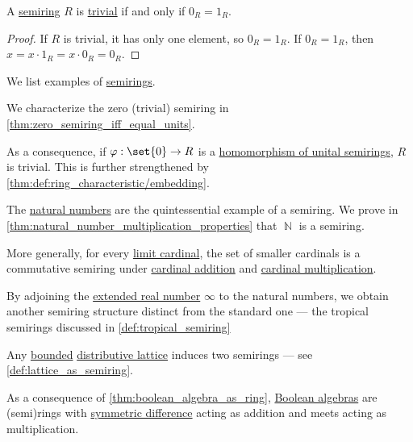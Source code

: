 \begin{proposition}\label{thm:zero_semiring_iff_equal_units}
  A \hyperref[def:semiring]{semiring} \( R \) is \hyperref[def:semiring/trivial]{trivial} if and only if \( 0_R = 1_R \).
\end{proposition}
\begin{proof}
  \SufficiencySubProof If \( R \) is trivial, it has only one element, so \( 0_R = 1_R \).
  \NecessitySubProof If \( 0_R = 1_R \), then \( x = x \cdot 1_R = x \cdot 0_R = 0_R \).
\end{proof}

\begin{example}\label{ex:def:semiring}
  We list examples of \hyperref[def:semiring]{semirings}.

  \begin{thmenum}
     We characterize the zero (trivial) semiring in \cref{thm:zero_semiring_iff_equal_units}.

    As a consequence, if \( \varphi: \set{ 0 } \to R \) is a \hyperref[def:semiring/morphism]{homomorphism of unital semirings}, \( R \) is trivial. This is further strengthened by \cref{thm:def:ring_characteristic/embedding}.

     The \hyperref[def:natural_numbers]{natural numbers} are the quintessential example of a semiring. We prove in \cref{thm:natural_number_multiplication_properties} that \( \BbbN \) is a semiring.

     More generally, for every \hyperref[def:successor_and_limit_cardinal]{limit cardinal}, the set of smaller cardinals is a commutative semiring under \hyperref[def:cardinal_addition]{cardinal addition} and \hyperref[def:cardinal_multiplication]{cardinal multiplication}.

     By adjoining the \hyperref[def:extended_real_numbers]{extended real number} \( \infty \) to the natural numbers, we obtain another semiring structure distinct from the standard one --- the tropical semirings discussed in \cref{def:tropical_semiring}

     Any \hyperref[def:bounded_lattice]{bounded} \hyperref[def:distributive_lattice]{distributive lattice} induces two semirings --- see \cref{def:lattice_as_semiring}.

     As a consequence of \cref{thm:boolean_algebra_as_ring}, \hyperref[def:boolean_algebra]{Boolean algebras} are (semi)rings with \hyperref[def:symmetric_difference]{symmetric difference} acting as addition and meets acting as multiplication.


\end{thmenum}
\end{example}
